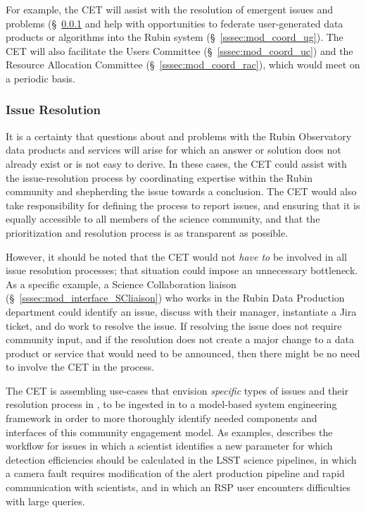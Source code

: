 \documentclass[DM,lsstdraft,toc]{lsstdoc}
\begin{document}
For example, the CET will assist with the resolution of emergent issues and problems (\S~\ref{sssec:mod_coord_res} and help with opportunities to federate user-generated data products or algorithms into the Rubin system (\S~\ref{sssec:mod_coord_ug}).
The CET will also facilitate the Users Committee (\S~\ref{sssec:mod_coord_uc}) and the Resource Allocation Committee (\S~\ref{sssec:mod_coord_rac}), which would meet on a periodic basis.


\subsubsection{Issue Resolution}\label{sssec:mod_coord_res}

It is a certainty that questions about and problems with the Rubin Observatory data products and services will arise for which an answer or solution does not already exist or is not easy to derive. 
In these cases, the CET could assist with the issue-resolution process by coordinating expertise within the Rubin community and shepherding the issue towards a conclusion.
The CET would also take responsibility for defining the process to report issues, and ensuring that it is equally accessible to all members of the science community, and that the prioritization and resolution process is as transparent as possible.

However, it should be noted that the CET would not \textit{have to} be involved in all issue resolution processes; that situation could impose an unnecessary bottleneck.
As a specific example, a Science Collaboration liaison (\S~\ref{sssec:mod_interface_SCliaison}) who works in the Rubin Data Production department could identify an issue, discuss with their manager, instantiate a Jira ticket, and do work to resolve the issue.
If resolving the issue does not require community input, and if the resolution does not create a major change to a data product or service that would need to be announced, then there might be no need to involve the CET in the process.

The CET is assembling use-cases that envision \textit{specific} types of issues and their resolution process in , to be ingested in to a model-based system engineering framework in order to more thoroughly identify needed components and interfaces of this community engagement model.
As examples,  describes the workflow for issues in which a scientist identifies a new parameter for which detection efficiencies should be calculated in the LSST science pipelines, in which a camera fault requires modification of the alert production pipeline and rapid communication with scientists, and in which an RSP user encounters difficulties with large queries. 
\end{document}
